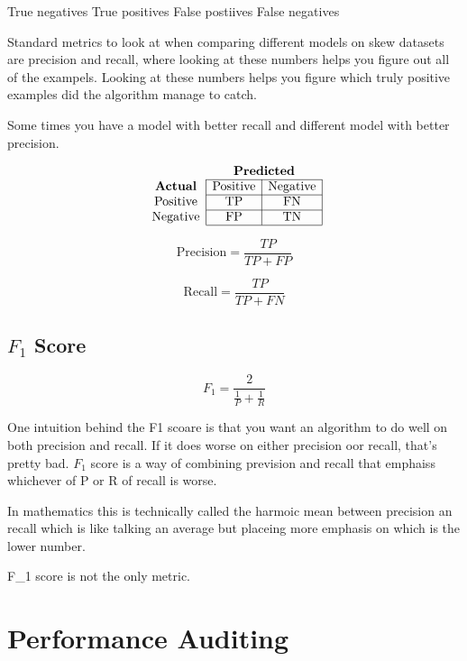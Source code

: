 True negatives
True positives
False postiives
False negatives



Standard metrics to look at when comparing different models on skew datasets are precision and recall, where looking at these numbers helps you figure out all of the exampels.
Looking at these numbers helps you figure which truly positive examples did the algorithm manage to catch.

Some times you have a model with better recall and different model with better precision.

\[
    \begin{array}{c|c|c|}
        \multicolumn{1}{c}{} & \multicolumn{2}{c}{\textbf{Predicted}} \\
        \cline{2-3}
        \textbf{Actual} & \text{Positive} & \text{Negative} \\
        \cline{2-3}
        \text{Positive} & \text{TP} & \text{FN} \\
        \cline{2-3}
        \text{Negative} & \text{FP} & \text{TN} \\
        \cline{2-3}
    \end{array}
\]

\[
    \text{Precision} = \frac{{TP}}{{TP} + {FP}}
\]

\[
    \text{Recall} = \frac{{TP}}{{TP} + {FN}}
\]


\subsection{$F_{1}$ Score}

\[
    F_1 = \frac{2}{\frac{1}{{P}} + \frac{1}{{R}}}
\]

One intuition behind the F1 scoare is that you want an algorithm to do well on both precision and recall. If it does worse on either precision oor recall, that's pretty bad.
$F_1$ score is a way of combining prevision and recall that emphaiss whichever of P or R of recall is worse.



In mathematics this is technically called the harmoic mean between precision an recall which is like talking an average but placeing more emphasis on which is the lower number.

F_1 score is not the only metric.

\section{Performance Auditing}

